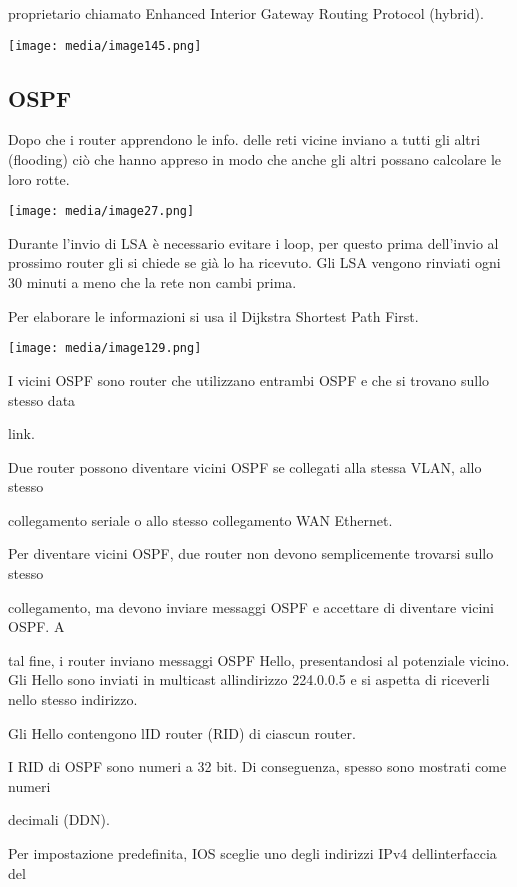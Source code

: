 proprietario chiamato Enhanced Interior Gateway Routing Protocol
(hybrid).

\texttt{[image: media/image145.png]}

\subsection{OSPF}\label{ospf}

Dopo che i router apprendono le info. delle reti vicine inviano a tutti
gli altri (flooding) ciò che hanno appreso in modo che anche gli altri
possano calcolare le loro rotte.

\texttt{[image: media/image27.png]}

Durante l'invio di LSA è necessario evitare i loop, per questo prima
dell'invio al prossimo router gli si chiede se già lo ha ricevuto. Gli
LSA vengono rinviati ogni 30 minuti a meno che la rete non cambi prima.

Per elaborare le informazioni si usa il Dijkstra Shortest Path First.

\texttt{[image: media/image129.png]}

I vicini OSPF sono router che utilizzano entrambi OSPF e che si trovano
sullo stesso data

link.

Due router possono diventare vicini OSPF se collegati alla stessa VLAN,
allo stesso

collegamento seriale o allo stesso collegamento WAN Ethernet.

Per diventare vicini OSPF, due router non devono semplicemente trovarsi
sullo stesso

collegamento, ma devono inviare messaggi OSPF e accettare di diventare
vicini OSPF. A

tal fine, i router inviano messaggi OSPF Hello, presentandosi al
potenziale vicino. Gli Hello sono inviati in multicast
all\textquotesingle indirizzo 224.0.0.5 e si aspetta di riceverli nello
stesso indirizzo.

Gli Hello contengono l\textquotesingle ID router (RID) di ciascun
router.

I RID di OSPF sono numeri a 32 bit. Di conseguenza, spesso sono mostrati
come numeri

decimali (DDN).

Per impostazione predefinita, IOS sceglie uno degli indirizzi IPv4
dell\textquotesingle interfaccia del

